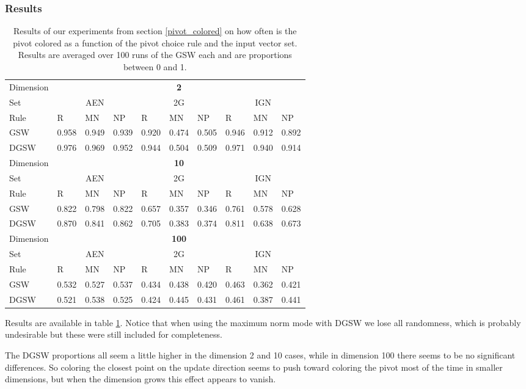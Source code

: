 \documentclass[12pt]{article}
\begin{document}
\subsubsection{Results}
\begin{table}[h!]
\centering
\caption{Results of our experiments from section \ref{pivot_colored} on how often is the pivot colored as a function of the pivot choice rule and the input vector set. Results are averaged over 100 runs of the GSW each and are proportions between 0 and 1.}
\begin{tabular}{l|lll|lll|lll}
Dimension &\multicolumn{9}{c}{\textbf{2}}\\
Set  & \multicolumn{3}{c}{AEN} & \multicolumn{3}{c}{2G} & \multicolumn{3}{c}{IGN} \\
Rule &R&MN&NP&R&MN&NP&R&MN&NP\\ \hline
GSW  &0.958&0.949&0.939&0.920&0.474&0.505&0.946&0.912&0.892\\
DGSW  &0.976&0.969&0.952&0.944&0.504&0.509&0.971&0.940&0.914\\
\hline
\hline
Dimension &\multicolumn{9}{c}{\textbf{10}}\\
Set  & \multicolumn{3}{c}{AEN} & \multicolumn{3}{c}{2G} & \multicolumn{3}{c}{IGN} \\
Rule &R&MN&NP&R&MN&NP&R&MN&NP\\ \hline
GSW  &0.822&0.798&0.822&0.657&0.357&0.346&0.761&0.578&0.628 \\
DGSW  &0.870&0.841&0.862&0.705&0.383&0.374&0.811&0.638&0.673\\
\hline
\hline
Dimension &\multicolumn{9}{c}{\textbf{100}}\\
Set  & \multicolumn{3}{c}{AEN} & \multicolumn{3}{c}{2G} & \multicolumn{3}{c}{IGN} \\
Rule &R&MN&NP&R&MN&NP&R&MN&NP\\ \hline
GSW  &0.532&0.527&0.537&0.434&0.438&0.420&0.463&0.362&0.421 \\
DGSW  &0.521&0.538&0.525&0.424&0.445&0.431&0.461&0.387&0.441\\
\end{tabular}
\label{pivot_colored_results}
\end{table}

Results are available in table \ref{pivot_colored_results}. Notice that when using the maximum norm mode with DGSW we lose all randomness, which is probably undesirable but these were still included for completeness.

The DGSW proportions all seem a little higher in the dimension 2 and 10 cases, while in dimension 100 there seems to be no significant differences. So coloring the closest point on the update direction seems to push toward coloring the pivot most of the time in smaller dimensions, but when the dimension grows this effect appears to vanish.
\end{document}

